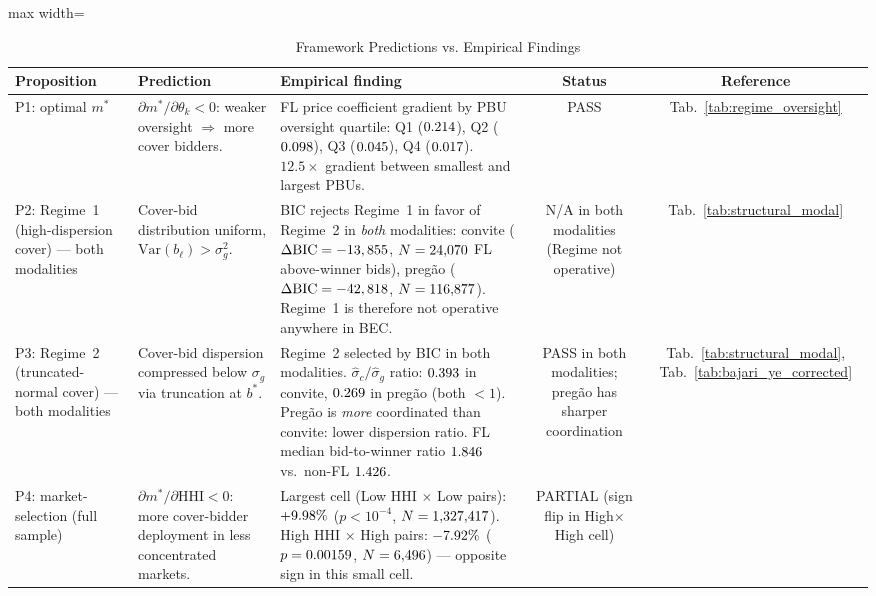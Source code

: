 \begin{table}[htbp]
\centering
\caption{Framework Predictions vs. Empirical Findings}
\label{tab:predictions_findings}
\begin{adjustbox}{max width=\textwidth}
\begin{threeparttable}
\small
\begin{tabular}{p{2.6cm}p{4.0cm}p{5.5cm}cc}
\toprule
Proposition & Prediction & Empirical finding & Status & Reference \\
\midrule
P1: optimal $m^*$
  & $\partial m^*/\partial \theta_k < 0$: weaker oversight $\Rightarrow$ more cover bidders.
  & FL price coefficient gradient by PBU oversight quartile: Q1 ($0.214$), Q2 ($0.098$), Q3 ($0.045$), Q4 ($0.017$). $12.5\!\!\times$ gradient between smallest and largest PBUs.
  & PASS
  & Tab.~\ref{tab:regime_oversight} \\[0.3em]
P2: Regime~1 (high-dispersion cover) --- both modalities
  & Cover-bid distribution uniform, $\mathrm{Var}(b_\ell) > \sigma_g^2$.
  & BIC rejects Regime~1 in favor of Regime~2 in \emph{both} modalities: convite ($\Delta\mathrm{BIC}=-13,855$, $N=24{,}070$ FL above-winner bids), pregão ($\Delta\mathrm{BIC}=-42,818$, $N=116{,}877$). Regime~1 is therefore not operative anywhere in BEC.
  & N/A in both modalities (Regime not operative)
  & Tab.~\ref{tab:structural_modal} \\[0.3em]
P3: Regime~2 (truncated-normal cover) --- both modalities
  & Cover-bid dispersion compressed below $\sigma_g$ via truncation at $b^*$.
  & Regime~2 selected by BIC in both modalities. $\hat{\sigma}_c/\hat{\sigma}_g$ ratio: $0.393$ in convite, $0.269$ in pregão (both $<1$). Pregão is \emph{more} coordinated than convite: lower dispersion ratio. FL median bid-to-winner ratio $1.846$ vs.\ non-FL $1.426$.
  & PASS in both modalities; pregão has sharper coordination
  & Tab.~\ref{tab:structural_modal}, Tab.~\ref{tab:bajari_ye_corrected} \\[0.3em]
P4: market-selection (full sample)
  & $\partial m^*/\partial \mathrm{HHI} < 0$: more cover-bidder deployment in less concentrated markets.
  & Largest cell (Low HHI $\times$ Low pairs): $+9.98\%$ ($p<10^{-4}$, $N=1{,}327{,}417$). High HHI $\times$ High pairs: $-7.92\%$ ($p=0.00159$, $N=6{,}496$) — opposite sign in this small cell.
  & PARTIAL (sign flip in High$\times$High cell)

\end{tabular}
\end{threeparttable}
\end{adjustbox}
\end{table}
